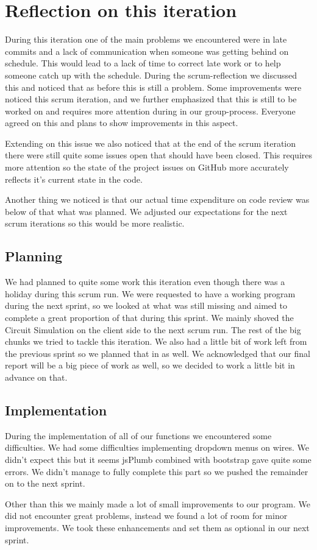 \documentclass[a4paper]{article}
\begin{document}
\pagebreak

\section{Reflection on this iteration}
During this iteration one of the main problems we encountered were in late commits and a lack of communication when someone was getting behind on schedule. This would lead to a lack of time to correct late work or to help someone catch up with the schedule. During the scrum-reflection we discussed this and noticed that as before this is still a problem. Some improvements were noticed this scrum iteration, and we further emphasized that this is still to be worked on and requires more attention during in our group-process. Everyone agreed on this and plans to show improvements in this aspect.

Extending on this issue we also noticed that at the end of the scrum iteration there were still quite some issues open that should have been closed. This requires more attention so the state of the project issues on GitHub more accurately reflects it's current state in the code.

Another thing we noticed is that our actual time expenditure on code review was below of that what was planned. We adjusted our expectations for the next scrum iterations so this would be more realistic.\\

\subsection{Planning}
We had planned to quite some work this iteration even though there was a holiday during this scrum run. We were requested to have a working program during the next sprint, so we looked at what was still missing and aimed to complete a great proportion of that during this sprint. We mainly shoved the Circuit Simulation on the client side to the next scrum run. The rest of the big chunks we tried to tackle this iteration. We also had a little bit of work left from the previous sprint so we planned that in as well. We acknowledged that our final report will be a big piece of work as well, so we decided to work a little bit in advance on that.
 
\subsection{Implementation}
During the implementation of all of our functions we encountered some difficulties. We had some difficulties implementing dropdown menus on wires. We didn't expect this but it seems jsPlumb combined with bootstrap gave quite some errors. We didn't manage to fully complete this part so we pushed the remainder on to the next sprint.

Other than this we mainly made a lot of small improvements to our program. We did not encounter great problems, instead we found a lot of room for minor improvements. We took these enhancements and set them as optional in our next sprint.
\end{document}

